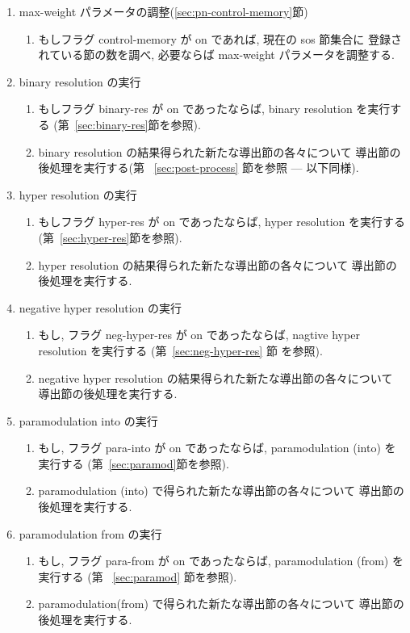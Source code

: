 \begin{enumerate}
\item max-weight パラメータの調整(\ref{sec:pn-control-memory}節)
  \begin{enumerate}
  \item もしフラグ control-memory が on であれば, 現在の sos 節集合に
    登録されている節の数を調べ, 必要ならば max-weight パラメータを調整する.
  \end{enumerate}
\item binary resolution の実行
  \begin{enumerate}
  \item もしフラグ binary-res が on であったならば, 
    binary resolution を実行する
    (第~\ref{sec:binary-res}節を参照). 
  \item binary resolution の結果得られた新たな導出節の各々について
    導出節の後処理を実行する(第 ~\ref{sec:post-process} 節を参照 --- 以下同様). 
  \end{enumerate}

\item hyper resolution の実行
  \begin{enumerate}
  \item もしフラグ hyper-res が on であったならば, 
    hyper resolution を実行する(第~\ref{sec:hyper-res}節を参照).
  \item hyper resolution の結果得られた新たな導出節の各々について
    導出節の後処理を実行する. 
  \end{enumerate}

\item negative hyper resolution の実行
  \begin{enumerate}
  \item もし, フラグ neg-hyper-res が on であったならば, 
    nagtive hyper resolution を実行する (第~\ref{sec:neg-hyper-res} 節
    を参照). 
  \item negative hyper resolution の結果得られた新たな導出節の各々について
    導出節の後処理を実行する. 
  \end{enumerate}

\item paramodulation into の実行
  \begin{enumerate}
  \item もし, フラグ para-into が on であったならば, 
    paramodulation (into) を実行する
    (第~\ref{sec:paramod}節を参照).
  \item paramodulation (into) で得られた新たな導出節の各々について
    導出節の後処理を実行する. 
  \end{enumerate}

\item paramodulation from の実行
  \begin{enumerate}
  \item もし, フラグ para-from が on であったならば, 
    paramodulation (from) を実行する
    (第 ~\ref{sec:paramod} 節を参照).
  \item paramodulation(from) で得られた新たな導出節の各々について
    導出節の後処理を実行する.
  \end{enumerate}
\end{enumerate}  

